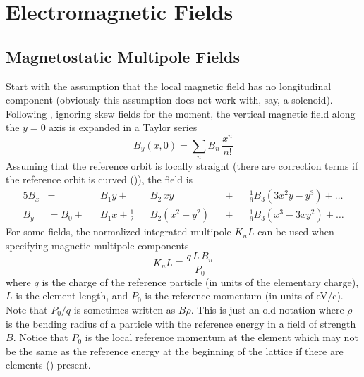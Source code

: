 \chapter{Electromagnetic Fields}

\section{Magnetostatic Multipole Fields}
\label{s:mag.field}

Start with the assumption that the local magnetic field has no longitudinal component
(obviously this assumption does not work with, say, a solenoid).  Following \mad, ignoring
skew fields for the moment, the vertical magnetic field along the $y = 0$ axis is expanded
in a Taylor series
\begin{equation}
  B_y(x, 0) = \sum_n B_n \, \frac{x^n}{n!}
  \label{byx0b}
\end{equation}
Assuming that the reference orbit is locally straight (there are correction terms if the
reference orbit is curved ()), the field is
\begin{alignat}{5}
  B_x &=           &&B_1 y \plus         &&B_2 \, xy       
                   && \plus && \frac{1}{6} B_3 (3x^2 y - y^3) \plus \ldots \\
  B_y &= B_0 \plus &&B_1 x + \frac{1}{2} &&B_2 (x^2 - y^2) 
                   && \plus && \frac{1}{6} B_3 (x^3 - 3x y^2) \plus \ldots
\end{alignat}
For some fields, the normalized integrated multipole $K_nL$ can be used when specifying
magnetic multipole components
\begin{equation}
  K_nL \equiv \frac{q \, L \, B_n}{P_0}
\end{equation}
where $q$ is the charge of the reference particle (in units of the elementary charge), $L$ is the
element length, and $P_0$ is the reference momentum (in units of eV/c).  Note that $P_0/q$ is
sometimes written as $B\rho$. This is just an old notation where $\rho$ is the bending radius of a
particle with the reference energy in a field of strength $B$. Notice that $P_0$ is the local
reference momentum at the element which may not be the same as the reference energy at the beginning
of the lattice if there are  elements () present.

